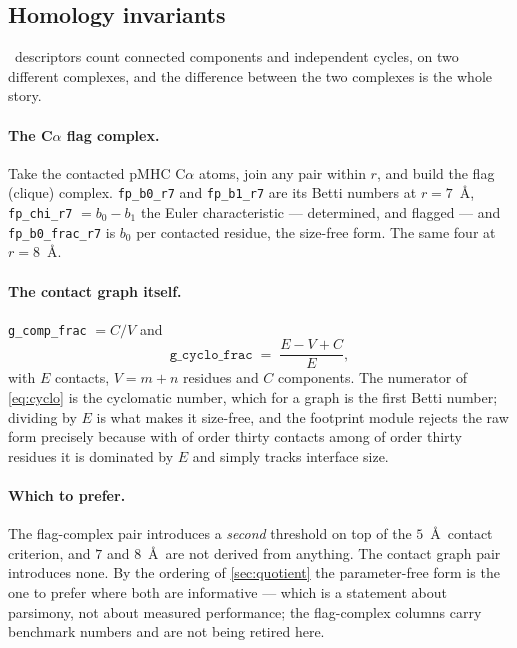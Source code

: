 \documentclass[11pt,a4paper]{article}
\newcommand{\dsc}[1]{\texttt{#1}}
\begin{document}
\subsection{Homology invariants}
\label{sec:homology}

\nOpHomology\ descriptors count connected components and independent cycles, on two different
complexes, and the difference between the two complexes is the whole story.

\paragraph{The C$\alpha$ flag complex.} Take the contacted pMHC C$\alpha$ atoms, join any pair
within $r$, and build the flag (clique) complex. \dsc{fp\_b0\_r7} and \dsc{fp\_b1\_r7} are its Betti
numbers at $r = 7$~\AA, \dsc{fp\_chi\_r7} $= b_0 - b_1$ the Euler characteristic --- determined, and
flagged --- and \dsc{fp\_b0\_frac\_r7} is $b_0$ per contacted residue, the size-free form. The same
four at $r = 8$~\AA.

\paragraph{The contact graph itself.} \dsc{g\_comp\_frac} $= C/V$ and
%
\begin{equation}
\dsc{g\_cyclo\_frac} \;=\; \frac{E - V + C}{E},
\label{eq:cyclo}
\end{equation}
%
with $E$ contacts, $V = m+n$ residues and $C$ components. The numerator of \cref{eq:cyclo} is the
cyclomatic number, which for a graph is the first Betti number; dividing by $E$ is what makes it
size-free, and the footprint module rejects the raw form precisely because with of order thirty
contacts among of order thirty residues it is dominated by $E$ and simply tracks interface size.

\paragraph{Which to prefer.} The flag-complex pair introduces a \emph{second} threshold on top of
the $5$~\AA\ contact criterion, and $7$ and $8$~\AA\ are not derived from anything. The contact
graph pair introduces none. By the ordering of \cref{sec:quotient} the parameter-free form is the
one to prefer where both are informative --- which is a statement about parsimony, not about
measured performance; the flag-complex columns carry benchmark numbers and are not being retired
here.
\end{document}
